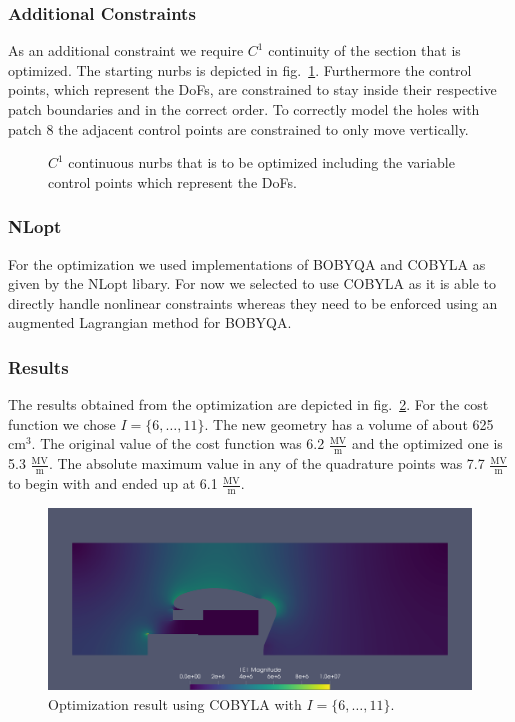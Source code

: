 \subsubsection{Additional Constraints}
As an additional constraint we require $C^1$ continuity of the section that is optimized. The starting nurbs is depicted in fig.~\ref{fig:nurbs}. Furthermore the control points, which represent the DoFs, are constrained to stay inside their respective patch boundaries and in the correct order. To correctly model the holes with patch 8 the adjacent control points are constrained to only move vertically.

\begin{center}
\begin{figure}[H]
  
  \caption{$C^1$ continuous nurbs that is to be optimized including the variable control points which represent the DoFs.}
  \label{fig:nurbs}
\end{figure}
\end{center}

\subsubsection{NLopt}
For the optimization we used implementations of BOBYQA and COBYLA as given by the NLopt libary. For now we selected to use COBYLA as it is able to directly handle nonlinear constraints whereas they need to be enforced using an augmented Lagrangian method for BOBYQA.

\subsubsection{Results}
The results obtained from the optimization are depicted in fig.~\ref{fig:results_iga}. For the cost function we chose $I=\{ 6, \dotsc, 11 \}$. The new geometry has a volume of about 625 $\mathrm{cm}^3$. The original value of the cost function was 6.2 $\frac{\mathrm{MV}}{\mathrm{m}}$ and the optimized one is 5.3 $\frac{\mathrm{MV}}{\mathrm{m}}$. The absolute maximum value in any of the quadrature points was 7.7 $\frac{\mathrm{MV}}{\mathrm{m}}$ to begin with and ended up at 6.1 $\frac{\mathrm{MV}}{\mathrm{m}}$.

\begin{center}
\begin{figure}[H]
  \includegraphics[width=\textwidth]{figures/200kV/png/cobyla_run11}
  \caption{Optimization result using COBYLA with $I=\{ 6, \dots, 11 \}$.}
  \label{fig:results_iga}
\end{figure}
\end{center}

